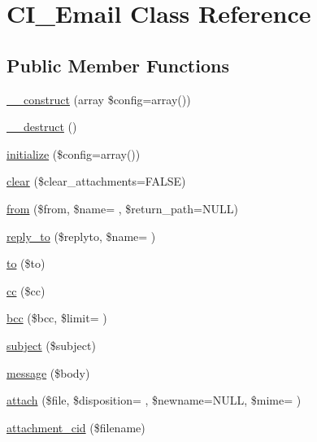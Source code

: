 \hypertarget{class_c_i___email}{}\section{C\+I\+\_\+\+Email Class Reference}
\label{class_c_i___email}
\subsection*{Public Member Functions}
\begin{DoxyCompactItemize}
\item 
\hyperlink{class_c_i___email_a35018c0dc92a448db5c4686364ced754}{\+\_\+\+\_\+construct} (array \$config=array())
\item 
\hyperlink{class_c_i___email_a421831a265621325e1fdd19aace0c758}{\+\_\+\+\_\+destruct} ()
\item 
\hyperlink{class_c_i___email_a481385e36d920f5a5005ace05c6cd016}{initialize} (\$config=array())
\item 
\hyperlink{class_c_i___email_a84399b20dfff67877099743270c68538}{clear} (\$clear\+\_\+attachments=F\+A\+L\+S\+E)
\item 
\hyperlink{class_c_i___email_ad8799b63fa9222a8e317cdc1e5ed3fad}{from} (\$from, \$name= \textquotesingle{}\textquotesingle{}, \$return\+\_\+path=N\+U\+L\+L)
\item 
\hyperlink{class_c_i___email_ad244902c2ebf2801454215eb6d7a813f}{reply\+\_\+to} (\$replyto, \$name= \textquotesingle{}\textquotesingle{})
\item 
\hyperlink{class_c_i___email_a453e853778ae341e4fb165551d1ba1aa}{to} (\$to)
\item 
\hyperlink{class_c_i___email_a785e883837f95eeffed21226563fc7e5}{cc} (\$cc)
\item 
\hyperlink{class_c_i___email_a630f55c2481b8810d109fbb876ced6cf}{bcc} (\$bcc, \$limit= \textquotesingle{}\textquotesingle{})
\item 
\hyperlink{class_c_i___email_aaa61b3aaa6cc4c90e26686e4bf41587a}{subject} (\$subject)
\item 
\hyperlink{class_c_i___email_a62559aacd297073072c30009daa8de86}{message} (\$body)
\item 
\hyperlink{class_c_i___email_a18d795bbcc864a5427a0696125ce2a30}{attach} (\$file, \$disposition= \textquotesingle{}\textquotesingle{}, \$newname=N\+U\+L\+L, \$mime= \textquotesingle{}\textquotesingle{})
\item 
\hyperlink{class_c_i___email_afd601b1ddbb0fc02f16f2e39d9881299}{attachment\+\_\+cid} (\$filename)

\end{DoxyCompactItemize}
